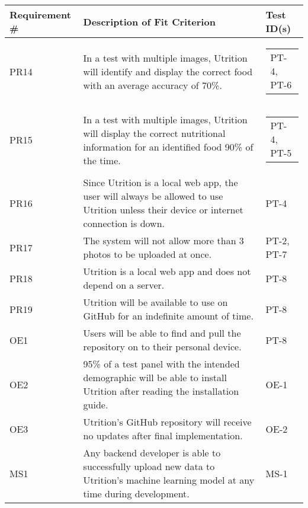\documentclass[12pt, titlepage]{article}
\begin{document}
	\begin{table}[H]
		\begin{tabularx}{\textwidth}{|l|X|l|}
			\hline
			{\bf Requirement \#} & {\bf Description of Fit Criterion} & {\bf Test ID(s)}\\
			\hline
			PR14 & In a test with multiple images, Utrition will identify and 
			display the correct food with an average accuracy of 70\%. & 
			\begin{tabular}[c]{@{}l@{}}PT-4, PT-6 \end{tabular}\\
			\hline
			PR15 & In a test with multiple images, Utrition will display the 
			correct nutritional information for an identified food 90\% of the 
			time. & \begin{tabular}[c]{@{}l@{}}PT-4, PT-5 \end{tabular}\\
			\hline
			PR16 & Since Utrition is a local web app, the user will always be allowed to use Utrition unless their device or internet connection is down. & PT-4\\
			\hline
			PR17 & The system will not allow more than 3 photos to be uploaded at once. & PT-2, PT-7\\
			\hline
			PR18 & Utrition is a local web app and does not depend on a server. & PT-8\\
			\hline
			PR19 & Utrition will be available to use on GitHub for an indefinite amount of time. & PT-8\\
			\hline
			OE1 & Users will be able to find and pull the repository on to their personal device. & PT-8\\
			\hline
			OE2 & 95\% of a test panel with the intended demographic will be able to install Utrition after reading the installation guide. & OE-1\\
			\hline
			OE3 & Utrition’s GitHub repository will receive no updates after final implementation. & OE-2\\
			\hline
			MS1 & Any backend developer is able to successfully upload new data to Utrition’s machine learning model at any time during development.  & MS-1\\
			\hline
		\end{tabularx}
	\end{table}
\end{document}
